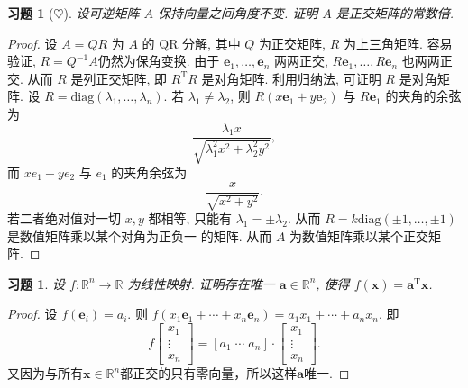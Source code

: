 \documentclass[UTF8]{ctexart}
\newtheorem{ex}[thm]{习题}
\begin{document}
\begin{ex}[\(\heartsuit\)]
  设可逆矩阵 \(A\) 保持向量之间角度不变.
  证明 \(A\) 是正交矩阵的常数倍.
\end{ex}

\begin{proof}
  设 \(A = QR\) 为 \(A\) 的 QR 分解, 其中 \(Q\) 为正交矩阵, \(R\) 为上三角矩阵.
  容易验证, \(R=Q^{-1}A\)仍然为保角变换. 由于
  \(\boldsymbol{e}_1,\ldots,\boldsymbol{e}_n\)
  两两正交, \(R\boldsymbol{e}_1,\ldots,R\boldsymbol{e}_n\) 也两两正交.
  从而 \(R\) 是列正交矩阵, 即 \(R^{\mathrm{T}}R\) 是对角矩阵.
  利用归纳法, 可证明 \(R\) 是对角矩阵.
  设 \(R = \mathrm{diag}(\lambda_1,\ldots,\lambda_n)\).
  若 \(\lambda_1 \neq \lambda_2\),
  则 \(R(x\boldsymbol{e}_1+y\boldsymbol{e}_2)\) 与 \(R\boldsymbol{e}_1\)
  的夹角的余弦为
  \begin{equation*}
    \frac{\lambda_1 x}{\sqrt{\lambda_1^2 x^2 + \lambda_2^2 y^2}},
  \end{equation*}
  而 \(xe_1 + ye_2\) 与 \(e_1\) 的夹角余弦为
  \begin{equation*}
    \frac{x}{\sqrt{x^2 + y^2}}.
  \end{equation*}
  若二者绝对值对一切 \(x,y\) 都相等, 只能有 \(\lambda_1 = \pm\lambda_2\).
  从而 \(R = k\mathrm{diag}(\pm1,\ldots,\pm 1)\) 是数值矩阵乘以某个对角为正负一
  的矩阵. 从而 \(A\) 为数值矩阵乘以某个正交矩阵.
\end{proof}

\begin{ex}
 设 \(f\colon \mathbb{R}^n \to \mathbb{R}\)
  为线性映射. 证明存在唯一 \(\boldsymbol{a} \in \mathbb{R}^n\),
  使得 \(f(\boldsymbol{x}) = \boldsymbol{a}^{\mathrm{T}}\boldsymbol{x}\).
\end{ex}

\begin{proof}
  设 \(f(\boldsymbol{e}_i) = a_i\).
  则 \(f(x_1 \boldsymbol{e}_1 + \cdots + x_n \boldsymbol{e}_n)=a_1 x_1 + \cdots + a_n x_n\).
  即
  \begin{equation*}
    f
    \begin{bmatrix}
      x_1 \\ \vdots \\ x_n
    \end{bmatrix}
    = [a_1 \; \cdots\; a_n]  \cdot
    \begin{bmatrix}
      x_1 \\ \vdots \\ x_n
    \end{bmatrix}. 
  \end{equation*}
又因为与所有$\boldsymbol{x}\in\mathbb{R}^n$都正交的只有零向量，所以这样$\boldsymbol{a}$唯一.\qedhere
\end{proof}
\end{document}
